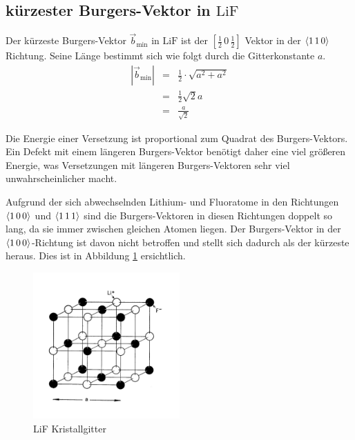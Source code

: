 \documentclass[12pt,a4paper]{scrartcl}
\numberwithin{equation}{section} %
\begin{document}
\hypertarget{kuxfcrzester-burgers-vektor-in-mathrmlif}{%
\subsection{\texorpdfstring{kürzester Burgers-Vektor in
$\mathrm{LiF}$}{kürzester Burgers-Vektor in \textbackslash mathrm\{LiF\}}}\label{kuxfcrzester-burgers-vektor-in-mathrmlif}}

Der kürzeste Burgers-Vektor $\vec{b}_\mathrm{min}$ in $\mathrm{LiF}$
ist der $[\frac{1}{2}\,0\,\frac{1}{2}]$ Vektor in der $\expval{1\,1\,0}$ Richtung. Seine Länge bestimmt sich wie folgt durch die Gitterkonstante $a$. \cite{Uni}
\begin{eqnarray}
    \left|\vec{b}_\mathrm{min}\right|
        &=& \frac{1}{2} \cdot \sqrt{a^2 + a^2} \\
        &=& \frac{1}{2} \sqrt{2} a \\
        &=& \frac{a}{\sqrt{2}}
\end{eqnarray}

\noindent
Die Energie einer Versetzung ist proportional zum Quadrat des
Burgers-Vektors. Ein Defekt mit einem längeren Burgers-Vektor benötigt
daher eine viel größeren Energie, was Versetzungen mit längeren
Burgers-Vektoren sehr viel unwahrscheinlicher macht.

Aufgrund der sich abwechselnden Lithium- und Fluoratome in den
Richtungen $\expval{1\,0\,0}$ und $\expval{1\,1\,1}$ sind die
Burgers-Vektoren in diesen Richtungen doppelt so lang, da sie immer
zwischen gleichen Atomen liegen. Der Burgers-Vektor in der
$\expval{1\,0\,0}$-Richtung ist davon nicht betroffen und stellt sich
dadurch als der kürzeste heraus. Dies ist in Abbildung \ref{abb:LiF Kristallgitter} ersichtlich.

\begin{figure}[ht]
\centering
\includegraphics[width=0.5\textwidth]{../media/B2.8/LiF.pdf}
\caption{LiF Kristallgitter \cite[S. 9]{Newey}}
\label{abb:LiF Kristallgitter}
\end{figure}
\end{document}
